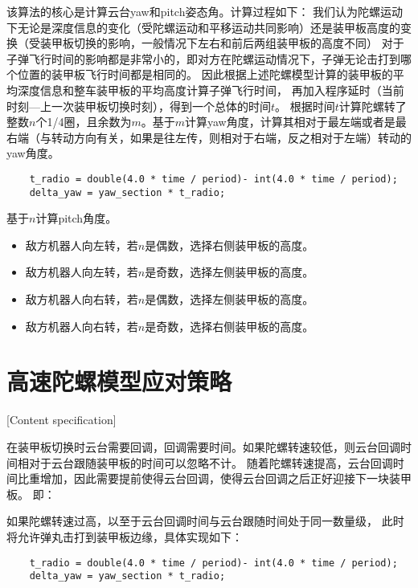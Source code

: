 该算法的核心是计算云台yaw和pitch姿态角。计算过程如下：
我们认为陀螺运动下无论是深度信息的变化（受陀螺运动和平移运动共同影响）还是装甲板高度的变换（受装甲板切换的影响，一般情况下左右和前后两组装甲板的高度不同）
对于子弹飞行时间的影响都是非常小的，即对方在陀螺运动情况下，子弹无论击打到哪个位置的装甲板飞行时间都是相同的。
因此根据上述陀螺模型计算的装甲板的平均深度信息和整车装甲板的平均高度计算子弹飞行时间，
再加入程序延时（当前时刻—上一次装甲板切换时刻），得到一个总体的时间$t$。
根据时间$t$计算陀螺转了整数$n$个1/4圈，且余数为$m$。基于$m$计算yaw角度，计算其相对于最左端或者是最右端（与转动方向有关，如果是往左传，则相对于右端，反之相对于左端）转动的yaw角度。

\begin{lstlisting}
    t_radio = double(4.0 * time / period)- int(4.0 * time / period);
    delta_yaw = yaw_section * t_radio;
\end{lstlisting}

基于$n$计算pitch角度。

\begin{itemize}[itemindent=2em]
    \item 敌方机器人向左转，若$n$是偶数，选择右侧装甲板的高度。
    \item 敌方机器人向左转，若$n$是奇数，选择左侧装甲板的高度。
    \item 敌方机器人向右转，若$n$是偶数，选择左侧装甲板的高度。
    \item 敌方机器人向右转，若$n$是奇数，选择右侧装甲板的高度。
\end{itemize}






\section{高速陀螺模型应对策略}[Content specification]


在装甲板切换时云台需要回调，回调需要时间。如果陀螺转速较低，则云台回调时间相对于云台跟随装甲板的时间可以忽略不计。
随着陀螺转速提高，云台回调时间比重增加，因此需要提前使得云台回调，使得云台回调之后正好迎接下一块装甲板。
即：


\par

如果陀螺转速过高，以至于云台回调时间与云台跟随时间处于同一数量级，
此时将允许弹丸击打到装甲板边缘，具体实现如下：

\begin{lstlisting}
    t_radio = double(4.0 * time / period)- int(4.0 * time / period);
    delta_yaw = yaw_section * t_radio;
\end{lstlisting}


